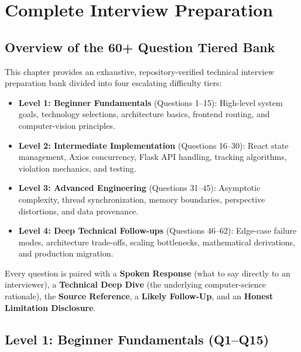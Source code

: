 \chapter{Complete Interview Preparation}

\section{Overview of the 60+ Question Tiered Bank}
This chapter provides an exhaustive, repository-verified technical interview preparation bank divided into four escalating difficulty tiers:
\begin{itemize}[leftmargin=*]
    \item \textbf{Level 1: Beginner Fundamentals} (Questions 1--15): High-level system goals, technology selections, architecture basics, frontend routing, and computer-vision principles.
    \item \textbf{Level 2: Intermediate Implementation} (Questions 16--30): React state management, Axios concurrency, Flask API handling, tracking algorithms, violation mechanics, and testing.
    \item \textbf{Level 3: Advanced Engineering} (Questions 31--45): Asymptotic complexity, thread synchronization, memory boundaries, perspective distortions, and data provenance.
    \item \textbf{Level 4: Deep Technical Follow-ups} (Questions 46--62): Edge-case failure modes, architecture trade-offs, scaling bottlenecks, mathematical derivations, and production migration.
\end{itemize}

Every question is paired with a \textbf{Spoken Response} (what to say directly to an interviewer), a \textbf{Technical Deep Dive} (the underlying computer-science rationale), the \textbf{Source Reference}, a \textbf{Likely Follow-Up}, and an \textbf{Honest Limitation Disclosure}.

\section{Level 1: Beginner Fundamentals (Q1--Q15)}

